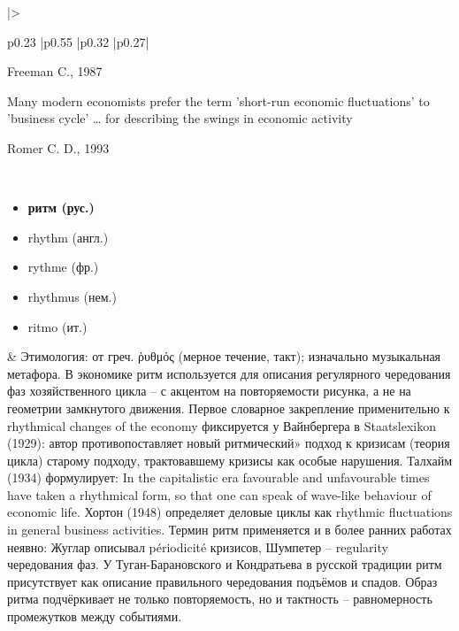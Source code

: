 \begin{longtable}{
    |>{\raggedright\arraybackslash}p{0.23\textwidth}
    |p{0.55\textwidth}
    |p{0.32\textwidth}
    |p{0.27\textwidth}|
    }
\begin{flushright}
    Freeman C., 1987\cite{Freeman-1987}
\end{flushright}
\vspace{7pt}
\textquotedbl{}Many modern economists prefer the term 'short-run economic fluctuations' to 'business cycle' … for describing the swings in economic activity\textquotedbl{}
\begin{flushright}
    Romer C. D., 1993\cite{Romer-1993}
\end{flushright}
\\ \hline

\begin{minipage}[t]{\linewidth}
    \raggedright
    \begin{itemize}
        \item \textbf{ритм (рус.)}
        \item rhythm (англ.)
        \item rythme (фр.)
        \item rhythmus (нем.)
        \item ritmo (ит.)
    \end{itemize}
\end{minipage}
&
Этимология: от греч. \textquotedbl{}\textgreek{ῥυθμός}\textquotedbl{} (мерное течение, такт); изначально музыкальная метафора. В экономике \textquotedbl{}ритм\textquotedbl{} используется для описания регулярного чередования фаз хозяйственного цикла – с акцентом на повторяемости рисунка, а не на геометрии замкнутого движения. Первое словарное закрепление применительно к \textquotedbl{}rhythmical changes of the economy\textquotedbl{} фиксируется у Вайнбергера в Staatslexikon (1929): автор противопоставляет новый \textquotedbl{}ритмический» подход к кризисам (теория цикла) старому подходу, трактовавшему кризисы как особые нарушения. Талхайм (1934) формулирует: \textquotedbl{}In the capitalistic era favourable and unfavourable times have taken a rhythmical form, so that one can speak of wave-like behaviour of economic life\textquotedbl{}. Хортон (1948) определяет деловые циклы как \textquotedbl{}rhythmic fluctuations in general business activities\textquotedbl{}. Термин \textquotedbl{}ритм\textquotedbl{} применяется и в более ранних работах неявно: Жуглар описывал \textquotedbl{}périodicité\textquotedbl{} кризисов, Шумпетер – \textquotedbl{}regularity\textquotedbl{} чередования фаз. У Туган-Барановского и Кондратьева в русской традиции \textquotedbl{}ритм\textquotedbl{} присутствует как описание правильного чередования подъёмов и спадов. Образ ритма подчёркивает не только повторяемость, но и тактность – равномерность промежутков между событиями.

\end{longtable}
